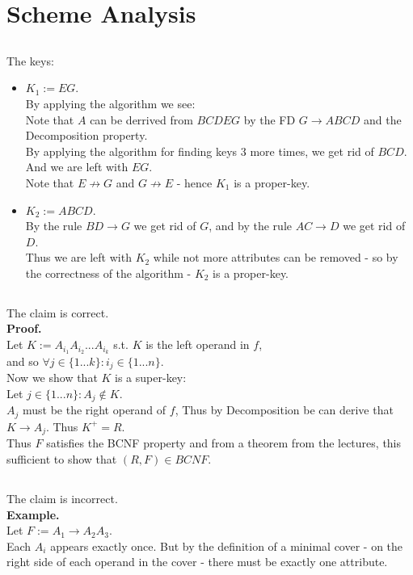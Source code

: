 \section{Scheme Analysis}
\subsection{}
The keys:
\begin{itemize}
	\item $K_1:= EG$.\\
	By applying the algorithm we see:\\
	Note that $A$ can be derrived from $BCDEG$ by the FD $G\rightarrow ABCD$
	and the Decomposition property.\\
	By applying the algorithm for finding keys 3 more times,
	we get rid of $BCD$. And we are left with $EG$.\\
	Note that $E\not\rightarrow G$ and $G\not\rightarrow E$ - 
	hence $K_1$ is a proper-key.

	\item $K_2:= ABCD$.\\
	By the rule $BD\rightarrow G$ we get rid of $G$,
	and by the rule $AC\rightarrow D$ we get rid of $D$.\\
	Thus we are left with $K_2$ while not more attributes can be removed -
	so by the correctness of the algorithm - $K_2$ is a proper-key.
\end{itemize}
\subsection{}

\subsection{}
The claim is correct.\\
\textbf{Proof.}\\
Let $K:=A_{i_1} A_{i_2} ... A_{i_k}$ s.t. $K$ is the left operand in $f$,\\
and so $\forall j\in\{1... k\}: i_j\in \{1...n\}$.\\

Now we show that $K$ is a super-key:\\
Let $j\in\{1...n\}: A_j\notin K$.\\
$A_j$ must be the right operand of $f$,
Thus by Decomposition be can derive that $K\rightarrow A_j$.
Thus $K^+=R$.\\
Thus $F$ satisfies the BCNF property and from a theorem from the lectures,
this sufficient to show that $(R,F)\in BCNF$.

\subsection{}
The claim is incorrect.\\
\textbf{Example.}\\
Let $F:=A_1\rightarrow A_2A_3$.\\
Each $A_i$ appears exactly once. But by the definition of a minimal cover - 
on the right side of each operand in the cover - there must be exactly one
attribute.